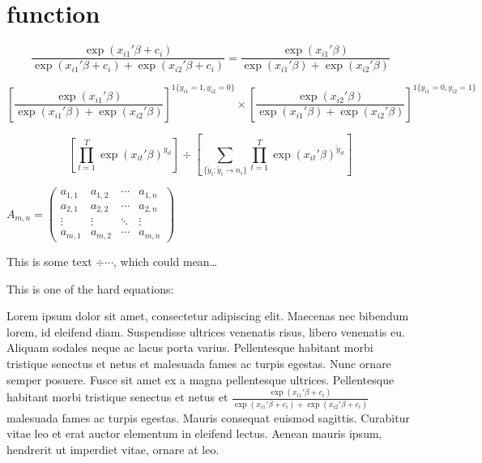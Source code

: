 \section{function}
\label{sec:function}

\begin{equation}
  \frac{\exp(x_{i1}{'}\beta + c_{i})}
       {\exp(x_{i1}{'}\beta + c_{i}) + \exp(x_{i2}{'}\beta + c_{i})} =
  \frac{\exp(x_{i1}{'}\beta)}
       {\exp(x_{i1}{'}\beta) + \exp(x_{i2}{'}\beta)}
\end{equation}

\begin{equation*}
  \left[\frac{\exp(x_{i1}'\beta)}
              {\exp(x_{i1}'\beta) + \exp(x_{i2}'\beta)}
   \right]^{1\{y_{i1} = 1, y_{i2} = 0\}} \times
  \left[\frac{\exp(x_{i2}'\beta)}
             {\exp(x_{i1}'\beta) + \exp(x_{i2}'\beta)}
  \right]^{1\{y_{i1} = 0, y_{i2} = 1\}}
\end{equation*}

\begin{equation}
  \left[\displaystyle\prod_{t=1}^{T} \exp(x_{it}{'}\beta)^{y_{it}}\right] \div
  \left[\displaystyle\sum_{\{\tilde{y}_{i} {:} \tilde{y}_{i} \to n_{i}\}}
     \displaystyle\prod_{t=1}^{T} \exp(x_{it}{'}\beta)^{\tilde{y}_{it}} \right]
\end{equation}

\begin{center}
$
A_{m,n} =
  \begin{pmatrix}
    a_{1,1}&a_{1,2}&\cdots&a_{1,n}\\
    a_{2,1}&a_{2,2}&\cdots&a_{2,n}\\
    \vdots & \vdots & \ddots & \vdots \\
    a_{m,1}&a_{m,2}&\cdots&a_{m,n}
  \end{pmatrix}
$
\end{center}

This is some text $\div\cdots$, which could mean\ldots

This is one of the hard equations:

Lorem ipsum dolor sit amet, consectetur adipiscing elit.
Maecenas nec bibendum lorem, id eleifend diam.
Suspendisse ultrices venenatis risus,   libero venenatis eu.
Aliquam sodales neque ac lacus porta varius.
Pellentesque habitant morbi tristique senectus et netus et malesuada fames ac
turpis egestas. Nunc ornare semper posuere. Fusce sit amet ex a magna
pellentesque ultrices. Pellentesque habitant morbi tristique senectus et netus
et ${\frac{\exp(x_{i1}{'}\beta + c_{i})}
     {\exp(x_{i1}{'}\beta + c_{i}) + \exp(x_{i2}{'}\beta + c_{i})}}$ malesuada fames ac turpis egestas. Mauris consequat euismod sagittis.
Curabitur vitae leo et erat auctor elementum in eleifend lectus. Aenean mauris
ipsum, hendrerit ut imperdiet vitae, ornare at leo.

